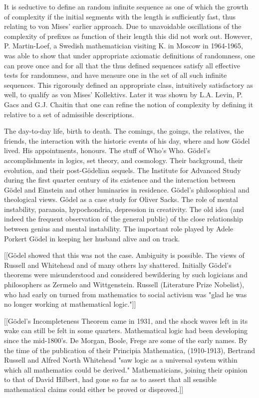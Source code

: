 \documentclass[7pt]{article}
\begin{document}
It is seductive to define an random infinite sequence as one of which the growth of complexity if the initial segments with the length is sufficiently fast, thus relating to von Mises' earlier approach. Due to unavoidable oscillations of the complexity of prefixes as function of their length this did not work out. However, P. Martin-Loef, a Swedish mathematician visiting K. in Moscow in 1964-1965, was able to show that under appropriate axiomatic definitions of randomness, one can prove once and for all that the thus defined sequences satisfy all effective tests for randomness, and have measure one in the set of all such infinite sequences. This rigorously defined an appropriate class, intuitively satisfactory as well, to qualify as von Mises' Kollektivs. Later it was shown by L.A. Levin, P. Gacs and G.J. Chaitin that one can refine the notion of complexity by defining it relative to a set of admissible descriptions.


The day-to-day life, birth to death. The comings, the goings, the relatives, the friends, the interaction with the historic events of his day, where and how Gödel lived. His appointments, honours. The stuff of Who's Who.
Gödel's accomplishments in logics, set theory, and cosmology. Their background, their evolution, and their post-Gödelian sequels.
The Institute for Advanced Study during the first quarter century of its existence and the interaction between Gödel and Einstein and other luminaries in residence.
Gödel's philosophical and theological views.
Gödel as a case study for Oliver Sacks. The role of mental instability, paranoia, hypochondria, depression in creativity. The old idea (and indeed the frequent observation of the general public) of the close relationship between genius and mental instability.
The important role played by Adele Porkert Gödel in keeping her husband alive and on track.



[[Gödel showed that this was not the case. Ambiguity is possible. The views of Russell and Whitehead and of many others lay shattered. Initially Gödel's theorems were misunderstood and considered bewildering by such logicians and philosophers as Zermelo and Wittgenstein. Russell (Literature Prize Nobelist), who had early on turned from mathematics to social activism was "glad he was no longer working at mathematical logic."]]


[[Gödel's Incompleteness Theorem came in 1931, and the shock waves left in its wake can still be felt in some quarters. Mathematical logic had been developing since the mid-1800's. De Morgan, Boole, Frege are some of the early names. By the time of the publication of their Principia Mathematica, (1910-1913), Bertrand Russell and Alfred North Whitehead "saw logic as a universal system within which all mathematics could be derived." Mathematicians, joining their opinion to that of David Hilbert, had gone so far as to assert that all sensible mathematical claims could either be proved or disproved.]]
\end{document}
